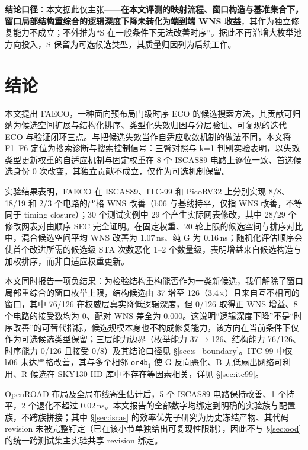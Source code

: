 \documentclass[twocolumn,10pt,fontset=windows]{ctexart}
\begin{document}
\textbf{结论口径}：本文据此仅主张——\textbf{在本文评测的映射流程、窗口构造与基准集合下，窗口局部结构重综合的逻辑深度下降未转化为端到端 WNS 收益}，其作为独立修复能力不成立；不外推为“S 在一般条件下无法改善时序”。据此不再沿增大枚举池方向投入，S 保留为可选候选类型，其质量归因列为后续工作。

\FloatBarrier
\section{结论}\label{sec:conclusion}

本文提出 FAECO，一种面向预布局门级时序 ECO 的候选搜索方法，其贡献可归纳为候选空间扩展与结构化排序、类型化失效归因与分层验证、可复现的迭代 ECO 与验证闭环三点。与把候选失效当作自适应收敛机制的做法不同，本文将 F1--F6 定位为搜索诊断与搜索控制信号：三臂对照与 k=1 判别实验表明，以失效类型更新权重的自适应机制与固定权重在 8 个 ISCAS89 电路上逐位一致、首选候选身份 0 次改变，其独立贡献不成立，仅作为可选机制保留。

实验结果表明，FAECO 在 ISCAS89、ITC-99 和 PicoRV32 上分别实现 8/8、18/19 和 2/3 个电路的严格 WNS 改善（b06 与基线持平，仅指 WNS 改善，不等同于 timing closure）；30 个测试实例中 29 个产生实际网表修改，其中 28/29 个修改网表对由顺序 SEC 完全证明。在固定权重、20 轮上限的候选空间与排序对比中，混合候选空间平均 WNS 改善为 1.07\,ns、纯 G 为 0.16\,ns；随机化评估顺序会使首个改进所需的候选级 STA 次数恶化 1--2 个数量级，表明增益来自候选构造与加权排序，而非自适应权重更新。

本文同时报告一项负结果：为检验结构重构能否作为一类新候选，我们解除了窗口局部重综合的窗口枚举上限，结构候选由 37 增至 126（3.4$\times$）且来自互不相同的窗口，其中 76/126 在权威层真实降低逻辑深度，但 0/126 取得正 WNS 增益、8 个电路的接受数均为 0、配对 WNS 差全为 0.000。这说明“逻辑深度下降”不是“时序改善”的可替代指标，候选规模本身也不构成修复能力，该方向在当前条件下仅作为可选候选类型保留；三层能力边界（枚举能力 37$\rightarrow$126、结构能力 76/126、时序能力 0/126 且接受 0/8）及其结论口径见 \S\ref{sec:s_boundary}。ITC-99 中仅 b06 未达严格改善，其与多个相邻 \texttt{or4b$_1$} 使 G 反向恶化、B 无低扇出网络可利用、R 候选在 SKY130 HD 库中不存在等因素相关，详见 \S\ref{sec:itc99}。

OpenROAD 布局及全局布线寄生估计后，5 个 ISCAS89 电路保持改善、1 个持平，2 个退化不超过 0.02\,ns。本文报告的全部数字均绑定到明确的实验族与配置族，不跨族拼接；其中 \S\ref{sec:iscas} 的效率优先子研究为历史冻结产物、其代码 revision 未被完整钉定（已在该小节单独给出可复现性限制），因此不与 \S\ref{sec:ood} 的统一跨测试集主实验共享 revision 绑定。
\end{document}
